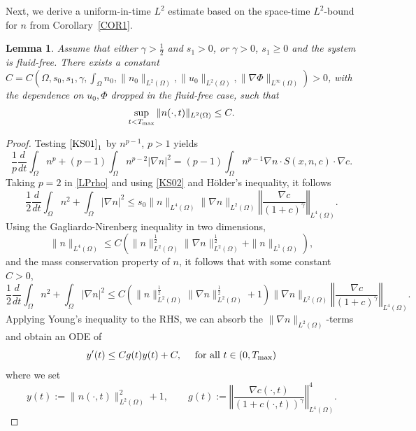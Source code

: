 \documentclass{amsart}
\newtheorem{lemma}[defn]{Lemma}
\numberwithin{equation}{section}
\newcommand{\norm}[1]{\left\Vert #1 \right\Vert}
\begin{document}
Next, we derive a uniform-in-time $L^2$ estimate based on the space-time $L^2$-bound for $n$ from Corollary~\ref{COR1}.


\begin{lemma}\label{RHOL2}
Assume that either $\gamma>\frac12$ and $s_1>0$, or $\gamma>0$, $s_1\ge0$ and the system is fluid-free.
There exists a constant $C=C (\Omega,s_0,s_1,\gamma,\textstyle\int_\Omega n_0, \|n_0\|_{L^2(\Omega)}, \|u_0\|_{L^2(\Omega)},\|\nabla\Phi\|_{L^\infty(\Omega)})>0$, with the dependence on $u_0,\Phi$ dropped in the fluid-free case, such that
\[
\sup_{t<T_{\rm max}} \| n(\cdot,t)\|_{L^{2}(\Omega)}   \le C.
  \]
\end{lemma}

\begin{proof}
Testing $\eqref{KS01}_{1}$ by $n^{p-1}$, $p>1$ yields 
\begin{equation}\label{LPrho}
\frac{1}{p}\frac{d}{dt}\int_{\Omega}n^{p}+(p-1)\int_{\Omega}n^{p-2}|\nabla n|^{2}= (p-1)\int_{\Omega}n^{p-1}\nabla n\cdot S(x,n,c)\cdot \nabla c.
\end{equation}
Taking $p=2$ in \eqref{LPrho} and using \eqref{KS02} and H\"older's inequality, it follows 
\begin{equation}
\frac{1}{2}\frac{d}{dt}\int_{\Omega}n^{2}+\int_{\Omega}|\nabla n|^{2}
\le s_{0}\|n\|_{L^{4}(\Omega)}\|\nabla n\|_{L^{2}(\Omega)}\norm{\frac{\nabla c}{(1+c)^{\gamma}}}_{L^{4}(\Omega)}.
\end{equation}
Using the Gagliardo-Nirenberg inequality in two dimensions,
\[
\|n\|_{L^{4}(\Omega)}\le C \left(\|  n\|_{L^{2}(\Omega)}^{\frac{1}{2}} \|  \nabla n\|_{L^{2}(\Omega)}^{\frac{1}{2}}+\|  n\|_{L^{1}(\Omega)} \right),
\]
and the mass conservation property of $n$, it follows that with some constant $C>0$,
\[
\frac{1}{2}\frac{d}{dt}\int_{\Omega}n^{2}+\int_{\Omega}|\nabla n|^{2}
\le C \left(\|  n\|_{L^{2}(\Omega)}^{\frac{1}{2}} \|  \nabla n\|_{L^{2}(\Omega)}^{\frac{1}{2}}+1 \right)\|\nabla n\|_{L^{2}(\Omega)}\norm{\frac{\nabla c}{(1+c)^{\gamma}}}_{L^{4}(\Omega)}.
\]
Applying Young's inequality to the RHS, we can absorb the $\|  \nabla n\|_{L^{2}(\Omega)}$-terms and obtain an ODE of 
\[
 y'(t)\le Cg(t)y(t)+C, \quad \mbox{ for all } t\in (0, T_{\rm max})
\] 
where we set
\[
y(t):= \|n(\cdot,t)\|_{L^{2}(\Omega)}^{2}+1,\qquad g(t):=\norm{\frac{\nabla c(\cdot,t)}{(1+c(\cdot, t))^{\gamma}}}_{L^{4}(\Omega)}^{4}.
\] 



\end{proof}
\end{document}
